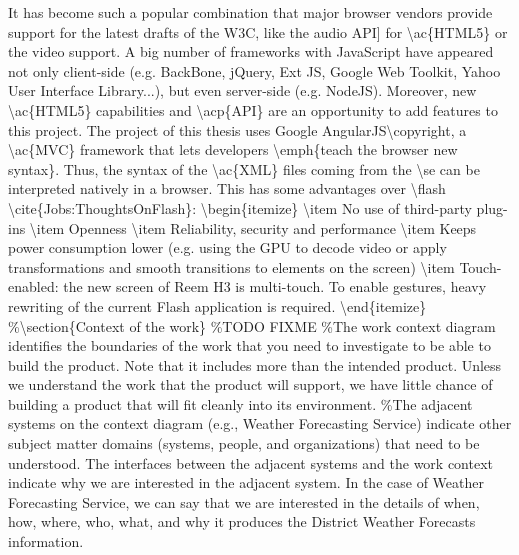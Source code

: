 It has become such a popular combination that major browser vendors provide support for the latest drafts of the \ac{W3C}, like the audio \ac{API] for \ac{HTML5} or the video support.
A big number of frameworks with JavaScript have appeared not only client-side (e.g. BackBone, jQuery, Ext JS, Google Web Toolkit, Yahoo User Interface Library...), but even server-side (e.g. NodeJS).
Moreover, new \ac{HTML5} capabilities and \acp{API} are an opportunity to add features to this project.

The project of this thesis uses Google AngularJS\copyright, a \ac{MVC} framework that lets developers \emph{teach the browser new syntax}. 
Thus, the syntax of the \ac{XML} files coming from the \se can be interpreted natively in a browser. 
This has some advantages over \flash \cite{Jobs:ThoughtsOnFlash}:
\begin{itemize}
    \item No use of third-party plug-ins
    \item Openness
    \item Reliability, security and performance
    \item Keeps power consumption lower (e.g. using the GPU to decode video or apply transformations and smooth transitions to elements on the screen)
    \item Touch-enabled: the new screen of Reem H3 is multi-touch. To enable gestures, heavy rewriting of the current Flash application is required.
\end{itemize}




}

